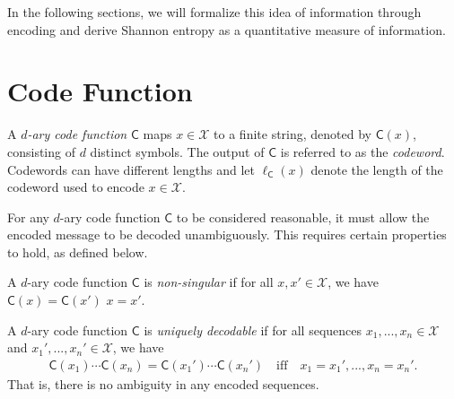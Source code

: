 \documentclass[a4paper]{article}
\begin{document}
In the following sections,
we will formalize this idea of information through encoding
and derive Shannon entropy as a quantitative measure of information.

\section{Code Function}

\begin{definition}
	A \emph{$d$-ary code function} $\mathsf{C}$ maps
	$x\in\mathcal{X}$ to a finite string, denoted by $\mathsf{C}(x)$, consisting of $d$ distinct symbols.
	The output of $\mathsf{C}$ is referred to as the \emph{codeword}.
	Codewords can have different lengths
	and let $\ell_{\mathsf{C}}(x)$ denote the length of the codeword used to encode $x\in\mathcal{X}$.
\end{definition}


\begin{remark}
	For any $d$-ary code function $\mathsf{C}$ to be considered reasonable,
	it must allow the encoded message to be decoded unambiguously.
	This requires certain properties to hold, as defined below.
\end{remark}

\begin{definition}
	A $d$-ary code function $\mathsf{C}$ is \emph{non-singular}
	if for all $x,x'\in\mathcal{X}$, we have $\mathsf{C}(x) = \mathsf{C}(x')$  $x=x'$.
\end{definition}

\begin{definition}
	A $d$-ary code function $\mathsf{C}$ is \emph{uniquely decodable}
	if for all sequences $x_1,...,x_n\in\mathcal{X}$ and $x_1',...,x_n'\in\mathcal{X}$,
	we have
	\begin{align*}
		\mathsf{C}(x_1)\cdots\mathsf{C}(x_n) = \mathsf{C}(x_1')\cdots\mathsf{C}(x_n')
		\quad\text{iff}\quad
		x_1=x_1',...,x_n=x_n'.
	\end{align*}
	That is, there is no ambiguity in any encoded sequences.
\end{definition}
\end{document}
